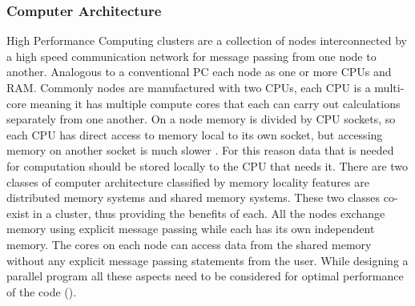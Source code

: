 \documentclass[preprint,11pt,authoryear]{elsarticle}
\begin{document}
\subsubsection{Computer Architecture}
 High Performance Computing clusters are a collection of nodes interconnected by a high speed 
communication network for message passing from one node to another. Analogous to a conventional 
PC each node as one or more CPUs and RAM. Commonly nodes are manufactured with two CPUs, each CPU 
is a multi-core meaning it has multiple compute cores that each can carry out calculations 
separately from one another. %
On a node memory is divided by CPU sockets, so each CPU has direct access to memory local to its own 
socket, but accessing memory on another socket is much slower \cite{Jin2011}. For this reason data 
that is needed for computation should be stored locally to the CPU that needs it.  
 There are two classes of computer architecture classified by memory locality features are 
distributed memory systems and shared memory systems. These two classes co-exist in a cluster, 
thus providing the benefits of each. All the nodes exchange memory using explicit message passing 
while each has its own independent memory. The cores on each node can access data from the 
shared memory without any explicit message passing statements from the user. While designing a 
parallel program all these aspects need to be considered for optimal performance of the code 
(\cite{Adhianto2007}).
\end{document}
